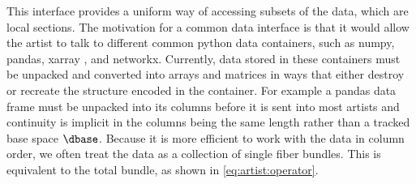 \documentclass[10pt,journal,compsoc]{IEEEtran}
\theoremstyle{definition}
\theoremstyle{remark}
\begin{document}
This interface provides a uniform way of accessing subsets of the data, which are local sections. The motivation for a common data interface is that it would allow the artist to talk to different common python data containers, such as numpy\cite{harris2020array}, pandas\cite{jeff_reback_2020_3715232}, xarray \cite{hoyer2017xarray}, and networkx\cite{HagbergExploringNetwork2008}. Currently, data stored in these containers must be unpacked and converted into arrays and matrices in ways that either destroy or recreate the structure encoded in the container. For example a pandas data frame must be unpacked into its columns before it is sent into most artists and continuity is implicit in the columns being the same length rather than a tracked base space $\dbase$. Because it is more efficient to work with the data in column order, we often treat the data as a collection of single fiber bundles. This is equivalent to the total bundle, as shown in \autoref{eq:artist:operator}. 
\end{document}
